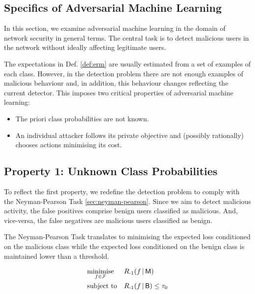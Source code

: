 \subsection{Specifics of Adversarial Machine Learning}

In this section, we examine adversarial machine learning in the domain of network security in general terms. The central task is to detect malicious users in the network without ideally affecting legitimate users.

The expectations in Def. \ref{def:erm} are usually estimated from a set of examples of each class. However, in the detection problem there are not enough examples of malicious behaviour and, in addition, this behaviour changes reflecting the current detector. This imposes two critical properties of adversarial machine learning:

\begin{itemize}
\item
    The priori class probabilities are not known.
\item
    An individual attacker follows its private objective and (possibly rationally) chooses actions minimising its cost.
\end{itemize}

\subsection{Property 1: Unknown Class Probabilities}

To reflect the first property, we redefine the detection problem to comply with the Neyman-Pearson Task \ref{sec:neyman-pearson}. Since we aim to detect malicious activity, the false positives comprise benign users classified as malicious. And, vice-versa, the false negatives are malicious users classified as benign.

\begin{definition}\label{def:np_task}
    The Neyman-Pearson Task translates to minimising the expected loss conditioned on the malicious class while the expected loss conditioned on the benign class is maintained lower than a threshold.

    \begin{equation}\label{eq:erm}
        \begin{aligned}
        & \underset{f \in \mathcal{F}} {\text{minimise}}
        & & R_{{\text{-}1}}(f \,|\, \mathsf{M}) \\
        & \text{subject to}
        & & R_{{\text{-}1}}(f \,|\, \mathsf{B}) \leq \tau_0 \\
        \end{aligned}
    \end{equation}
\end{definition}

